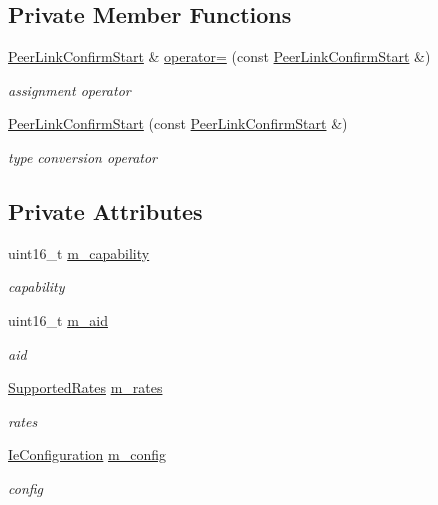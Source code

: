 \subsection*{Private Member Functions}
\begin{DoxyCompactItemize}
\item 
\hyperlink{classns3_1_1dot11s_1_1PeerLinkConfirmStart}{Peer\+Link\+Confirm\+Start} \& \hyperlink{classns3_1_1dot11s_1_1PeerLinkConfirmStart_a9a18144e5f54c56e2ba973b0c1c94373}{operator=} (const \hyperlink{classns3_1_1dot11s_1_1PeerLinkConfirmStart}{Peer\+Link\+Confirm\+Start} \&)
\begin{DoxyCompactList}\small\item\em assignment operator \end{DoxyCompactList}\item 
\hyperlink{classns3_1_1dot11s_1_1PeerLinkConfirmStart_abe3087df8dfcd5702629b105e900b460}{Peer\+Link\+Confirm\+Start} (const \hyperlink{classns3_1_1dot11s_1_1PeerLinkConfirmStart}{Peer\+Link\+Confirm\+Start} \&)
\begin{DoxyCompactList}\small\item\em type conversion operator \end{DoxyCompactList}\end{DoxyCompactItemize}
\subsection*{Private Attributes}
\begin{DoxyCompactItemize}
\item 
uint16\+\_\+t \hyperlink{classns3_1_1dot11s_1_1PeerLinkConfirmStart_a53aa2b2815f2090139f626ee2985e189}{m\+\_\+capability}
\begin{DoxyCompactList}\small\item\em capability \end{DoxyCompactList}\item 
uint16\+\_\+t \hyperlink{classns3_1_1dot11s_1_1PeerLinkConfirmStart_a2b00d549e27594da24bda1c21267f276}{m\+\_\+aid}
\begin{DoxyCompactList}\small\item\em aid \end{DoxyCompactList}\item 
\hyperlink{classns3_1_1SupportedRates}{Supported\+Rates} \hyperlink{classns3_1_1dot11s_1_1PeerLinkConfirmStart_a978ad2bf7e74e9d4e5010c87dbcf59c8}{m\+\_\+rates}
\begin{DoxyCompactList}\small\item\em rates \end{DoxyCompactList}\item 
\hyperlink{classns3_1_1dot11s_1_1IeConfiguration}{Ie\+Configuration} \hyperlink{classns3_1_1dot11s_1_1PeerLinkConfirmStart_ab7475e6d7ec070e3da15e13cbacc0f96}{m\+\_\+config}
\begin{DoxyCompactList}\small\item\em config \end{DoxyCompactList}\end{DoxyCompactItemize}
